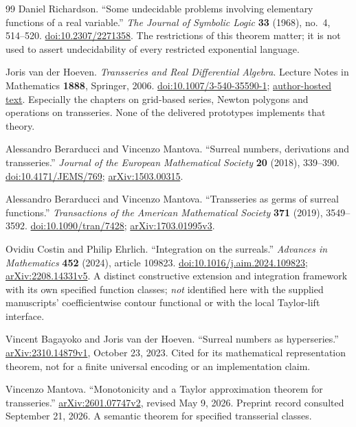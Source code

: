 \documentclass[11pt,letterpaper]{article}
\numberwithin{equation}{section}
\theoremstyle{definition}
\theoremstyle{remark}
\begin{document}
\begin{thebibliography}{99}
Daniel Richardson. ``Some undecidable problems involving elementary functions of
a real variable.'' \emph{The Journal of Symbolic Logic} \textbf{33} (1968),
no.~4, 514--520. \href{https://doi.org/10.2307/2271358}{doi:10.2307/2271358}.
The restrictions of this theorem matter; it is not used to assert undecidability
of every restricted exponential language.

Joris van der Hoeven. \emph{Transseries and Real Differential Algebra}. Lecture
Notes in Mathematics \textbf{1888}, Springer, 2006.
\href{https://doi.org/10.1007/3-540-35590-1}{doi:10.1007/3-540-35590-1};
\href{https://www.texmacs.org/joris/ln/ln.html}{author-hosted text}. Especially
the chapters on grid-based series, Newton polygons and operations on
transseries. None of the delivered prototypes implements that theory.

Alessandro Berarducci and Vincenzo Mantova. ``Surreal numbers, derivations and
transseries.'' \emph{Journal of the European Mathematical Society} \textbf{20}
(2018), 339--390.
\href{https://doi.org/10.4171/JEMS/769}{doi:10.4171/JEMS/769};
\href{https://arxiv.org/abs/1503.00315}{arXiv:1503.00315}.

Alessandro Berarducci and Vincenzo Mantova. ``Transseries as germs of surreal
functions.'' \emph{Transactions of the American Mathematical Society}
\textbf{371} (2019), 3549--3592.
\href{https://doi.org/10.1090/tran/7428}{doi:10.1090/tran/7428};
\href{https://arxiv.org/abs/1703.01995}{arXiv:1703.01995v3}.

Ovidiu Costin and Philip Ehrlich. ``Integration on the surreals.''
\emph{Advances in Mathematics} \textbf{452} (2024), article 109823.
\href{https://doi.org/10.1016/j.aim.2024.109823}{doi:10.1016/j.aim.2024.109823};
\href{https://arxiv.org/abs/2208.14331}{arXiv:2208.14331v5}. A distinct
constructive extension and integration framework with its own specified function
classes; \emph{not} identified here with the supplied manuscripts'
coefficientwise contour functional or with the local Taylor-lift interface.

Vincent Bagayoko and Joris van der Hoeven. ``Surreal numbers as hyperseries.''
\href{https://arxiv.org/abs/2310.14879}{arXiv:2310.14879v1}, October 23, 2023.
Cited for its mathematical representation theorem, not for a finite universal
encoding or an implementation claim.

Vincenzo Mantova. ``Monotonicity and a Taylor approximation theorem for
transseries.'' \href{https://arxiv.org/abs/2601.07747}{arXiv:2601.07747v2},
revised May 9, 2026. Preprint record consulted September 21, 2026. A semantic
theorem for specified transserial classes.


\end{thebibliography}
\end{document}
